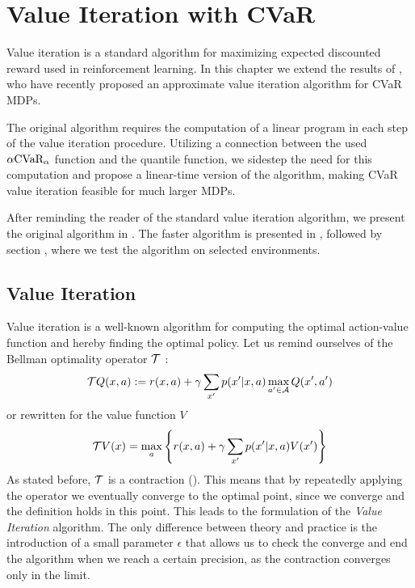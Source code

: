 \chapter{Value Iteration with CVaR}\label{ch:vi}

Value iteration is a standard algorithm for maximizing expected discounted reward used in reinforcement learning. In this chapter we extend the results of \citet{chow2015risk}, who have recently proposed an approximate value iteration algorithm for CVaR MDPs. 

The original algorithm requires the computation of a linear program in each step of the value iteration procedure. Utilizing a connection between the used $\alpha \text{CVaR}_\alpha$ function and the quantile function, we sidestep the need for this computation and propose a linear-time version of the algorithm, making CVaR value iteration feasible for much larger MDPs. 

After reminding the reader of the standard value iteration algorithm, we present the original algorithm in . The faster algorithm is presented in  , followed by section , where we test the algorithm on selected environments.


\section{Value Iteration}

Value iteration \citep{sutton1998reinforcement} is a well-known algorithm for computing the optimal action-value function and hereby finding the optimal policy. Let us remind ourselves of the Bellman optimality operator $\mathcal{T}$ :
\begin{equation*}
\mathcal{T} Q(x,a) := r(x, a) + \gamma \sum_{x'}p(x'|x, a) \max_{a' \in \mathcal{A}}Q(x', a')
\end{equation*}
or rewritten for the value function $V$
\begin{equation}
\mathcal{T} V(x) = \max_a\left\{ {r(x, a) + \gamma\sum_{x'}p(x'|x, a)V(x')} \right\}
\end{equation}
As stated before, $\mathcal{T}$ is a contraction (). This means that by repeatedly applying the operator we eventually converge to the optimal point, since we converge and the definition holds in this point. This leads to the formulation of the \textit{Value Iteration} algorithm. The only difference between theory and practice is the introduction of a small parameter $\epsilon$ that allows us to check the converge and end the algorithm when we reach a certain precision, as the contraction converges only in the limit.

